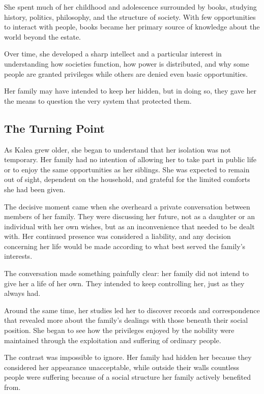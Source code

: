 \documentclass[11pt,a4paper,twoside]{article}
\begin{document}
She spent much of her childhood and adolescence surrounded by books, studying history, politics, philosophy, and the structure of society. With few opportunities to interact with people, books became her primary source of knowledge about the world beyond the estate.

Over time, she developed a sharp intellect and a particular interest in understanding how societies function, how power is distributed, and why some people are granted privileges while others are denied even basic opportunities.

Her family may have intended to keep her hidden, but in doing so, they gave her the means to question the very system that protected them.

\subsection{The Turning Point}

As Kalea grew older, she began to understand that her isolation was not temporary. Her family had no intention of allowing her to take part in public life or to enjoy the same opportunities as her siblings. She was expected to remain out of sight, dependent on the household, and grateful for the limited comforts she had been given.

The decisive moment came when she overheard a private conversation between members of her family. They were discussing her future, not as a daughter or an individual with her own wishes, but as an inconvenience that needed to be dealt with. Her continued presence was considered a liability, and any decision concerning her life would be made according to what best served the family's interests.

The conversation made something painfully clear: her family did not intend to give her a life of her own. They intended to keep controlling her, just as they always had.

Around the same time, her studies led her to discover records and correspondence that revealed more about the family's dealings with those beneath their social position. She began to see how the privileges enjoyed by the nobility were maintained through the exploitation and suffering of ordinary people.

The contrast was impossible to ignore. Her family had hidden her because they considered her appearance unacceptable, while outside their walls countless people were suffering because of a social structure her family actively benefited from.
\end{document}
